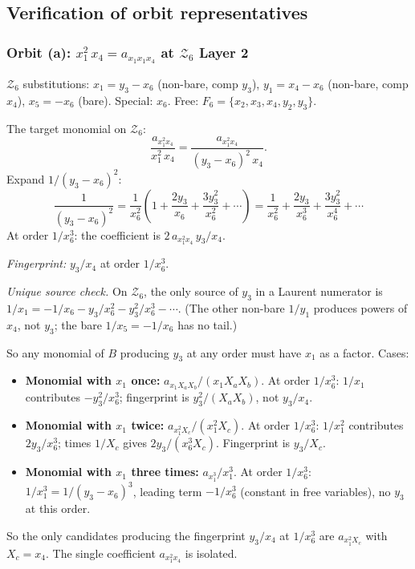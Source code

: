 \documentclass[11pt]{article}
\newcommand{\Z}{\mathcal{Z}}
\theoremstyle{definition}
\begin{document}
\subsection{Verification of orbit representatives}
\label{sec:orbit-verif}

\subsubsection*{Orbit (a): $x_1^2\,x_4 = a_{x_1 x_1 x_4}$ at $\Z_6$ Layer 2}

$\Z_6$ substitutions: $x_1 = y_3 - x_6$ (non-bare, comp $y_3$),
$y_1 = x_4 - x_6$ (non-bare, comp $x_4$), $x_5 = -x_6$ (bare).
Special: $x_6$. Free: $F_6 = \{x_2, x_3, x_4, y_2, y_3\}$.

The target monomial on $\Z_6$:
\[
\frac{a_{x_1^2 x_4}}{x_1^2\,x_4} = \frac{a_{x_1^2 x_4}}{(y_3 - x_6)^2\,x_4}.
\]
Expand $1/(y_3 - x_6)^2$:
\[
\frac{1}{(y_3 - x_6)^2} = \frac{1}{x_6^2}\left(1 + \frac{2y_3}{x_6} + \frac{3y_3^2}{x_6^2} + \cdots\right) = \frac{1}{x_6^2} + \frac{2y_3}{x_6^3} + \frac{3y_3^2}{x_6^4} + \cdots
\]
At order $1/x_6^3$: the coefficient is $2\,a_{x_1^2 x_4}\,y_3/x_4$.

\emph{Fingerprint:} $y_3/x_4$ at order $1/x_6^3$.

\emph{Unique source check.} On $\Z_6$, the only source of $y_3$ in a Laurent
numerator is $1/x_1 = -1/x_6 - y_3/x_6^2 - y_3^2/x_6^3 - \cdots$. (The other
non-bare $1/y_1$ produces powers of $x_4$, not $y_3$; the bare $1/x_5=-1/x_6$
has no tail.)

So any monomial of $B$ producing $y_3$ at any order must have $x_1$ as a
factor. Cases:
\begin{itemize}[nosep,leftmargin=2em]
\item \textbf{Monomial with $x_1$ once:} $a_{x_1 X_a X_b}/(x_1 X_a X_b)$. At
order $1/x_6^3$: $1/x_1$ contributes $-y_3^2/x_6^3$; fingerprint is
$y_3^2/(X_a X_b)$, not $y_3/x_4$.
\item \textbf{Monomial with $x_1$ twice:} $a_{x_1^2 X_c}/(x_1^2 X_c)$. At
order $1/x_6^3$: $1/x_1^2$ contributes $2y_3/x_6^3$; times $1/X_c$ gives
$2y_3/(x_6^3 X_c)$. Fingerprint is $y_3/X_c$.
\item \textbf{Monomial with $x_1$ three times:} $a_{x_1^3}/x_1^3$. At order
$1/x_6^3$: $1/x_1^3 = 1/(y_3-x_6)^3$, leading term $-1/x_6^3$ (constant in
free variables), no $y_3$ at this order.
\end{itemize}
So the only candidates producing the fingerprint $y_3/x_4$ at $1/x_6^3$ are
$a_{x_1^2 X_c}$ with $X_c = x_4$. The single coefficient $a_{x_1^2 x_4}$ is
isolated.
\end{document}
